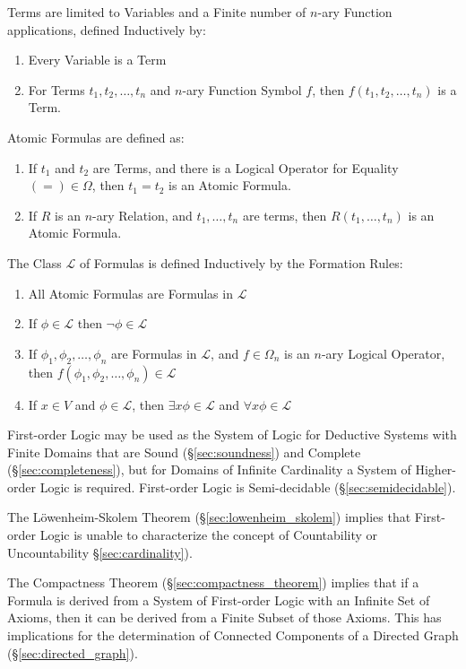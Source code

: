 Terms are limited to Variables and a Finite number of $n$-ary Function
applications, defined Inductively by:
\begin{enumerate}
  \item Every Variable is a Term
  \item For Terms $t_1, t_2, \ldots, t_n$ and $n$-ary Function Symbol
    $f$, then $f(t_1, t_2, \ldots, t_n)$ is a Term.
\end{enumerate}
Atomic Formulas are defined as:
\begin{enumerate}
\item If $t_1$ and $t_2$ are Terms, and there is a Logical Operator
  for Equality\\$(=) \in \Omega$, then $t_1 = t_2$ is an Atomic
  Formula.
\item If $R$ is an $n$-ary Relation, and $t_1,\ldots,t_n$ are terms,
  then $R(t_1,\ldots,t_n)$ is an Atomic Formula.
\end{enumerate}
The Class $\mathcal{L}$ of Formulas is defined Inductively by the
Formation Rules:
\begin{enumerate}
\item All Atomic Formulas are Formulas in $\mathcal{L}$
\item If $\phi \in \mathcal{L}$ then $\neg \phi \in \mathcal{L}$
\item If $\phi_1, \phi_2, \dots, \phi_n$ are Formulas in
  $\mathcal{L}$, and $f \in \Omega_n$ is an $n$-ary Logical Operator,
  then $f (\phi_1, \phi_2, \ldots, \phi_n) \in \mathcal{L}$
\item If $x \in V$ and $\phi \in \mathcal{L}$, then $\exists x \phi
  \in \mathcal{L}$ and $\forall x \phi \in \mathcal{L}$
\end{enumerate}

First-order Logic may be used as the System of Logic for Deductive
Systems with Finite Domains that are Sound (\S\ref{sec:soundness}) and
Complete (\S\ref{sec:completeness}), but for Domains of Infinite
Cardinality a System of Higher-order Logic is required. First-order
Logic is Semi-decidable (\S\ref{sec:semidecidable}).

The L\"owenheim-Skolem Theorem (\S\ref{sec:lowenheim_skolem}) implies
that First-order Logic is unable to characterize the concept of
Countability or Uncountability \S\ref{sec:cardinality}).

The Compactness Theorem (\S\ref{sec:compactness_theorem}) implies that
if a Formula is derived from a System of First-order Logic with an
Infinite Set of Axioms, then it can be derived from a Finite Subset of
those Axioms. This has implications for the determination of Connected
Components of a Directed Graph (\S\ref{sec:directed_graph}).



